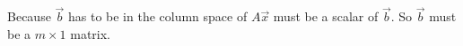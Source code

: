 				Because $\vec{b}$ has to be in the column space of $A\vec{x}$ must be a scalar of $\vec{b}$. So $\vec{b}$ must be a $m\times1$ matrix.

